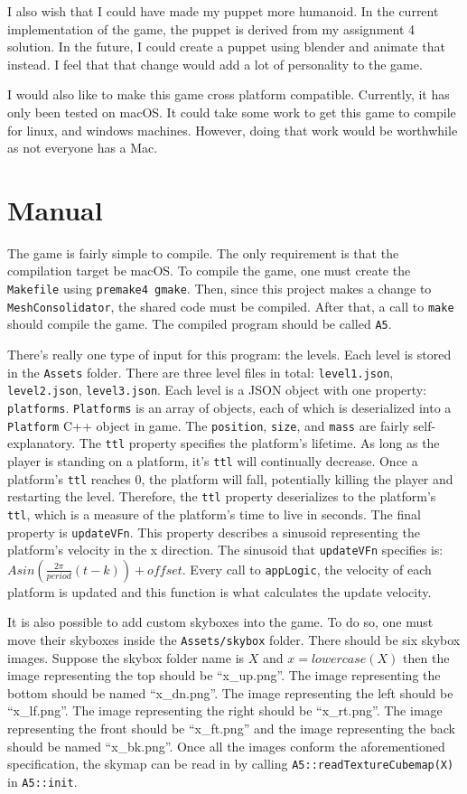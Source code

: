 \documentclass[11pt]{report}
\begin{document}
I also wish that I could have made my puppet more humanoid. In the current implementation of the game, the puppet is derived from my assignment 4 solution. In the future, I could create a puppet using blender and animate that instead. I feel that that change would add a lot of personality to the game.

I would also like to make this game cross platform compatible. Currently, it has only been tested on macOS. It could take some work to get this game to compile for linux, and windows machines. However, doing that work would be worthwhile as not everyone has a Mac.

\chapter{Manual}
The game is fairly simple to compile. The only requirement is that the compilation target be macOS. To compile the game, one must create the \verb|Makefile| using \verb|premake4 gmake|. Then, since this project makes a change to \verb|MeshConsolidator|, the shared code must be compiled. After that, a call to \verb|make| should compile the game. The compiled program should be called \verb|A5|.

There's really one type of input for this program: the levels. Each level is stored in the \verb|Assets| folder. There are three level files in total: \verb|level1.json|, \verb|level2.json|, \verb|level3.json|. Each level is a JSON object with one property: \verb|platforms|. \verb|Platforms| is an array of objects, each of which is deserialized into a \verb|Platform| C++ object in game. The \verb|position|, \verb|size|, and \verb|mass| are fairly self-explanatory. The \verb|ttl| property specifies the platform's lifetime. As long as the player is standing on a platform, it's \verb|ttl| will continually decrease. Once a platform's \verb|ttl| reaches 0, the platform will fall, potentially killing the player and restarting the level. Therefore, the \verb|ttl| property deserializes to the platform's \verb|ttl|, which is a measure of the platform's time to live in seconds. The final property is \verb|updateVFn|. This property describes a sinusoid representing the platform's velocity in the x direction. The sinusoid that \verb|updateVFn| specifies is: $A sin\left(\frac{2\pi}{period}\left(t - k\right)\right) + offset$. Every call to \verb|appLogic|, the velocity of each platform is updated and this function is what calculates the update velocity.

It is also possible to add custom skyboxes into the game. To do so, one must move their skyboxes inside the \verb|Assets/skybox| folder. There should be six skybox images. Suppose the skybox folder name is $X$ and $x = lowercase(X)$ then the image representing the top should be ``x\_up.png''. The image representing the bottom should be named ``x\_dn.png''. The image representing the left should be ``x\_lf.png''. The image representing the right should be ``x\_rt.png''. The image representing the front should be ``x\_ft.png'' and the image representing the back should be named ``x\_bk.png''. Once all the images conform the aforementioned specification, the skymap can be read in by calling \verb|A5::readTextureCubemap(X)| in \verb|A5::init|.
\end{document}
